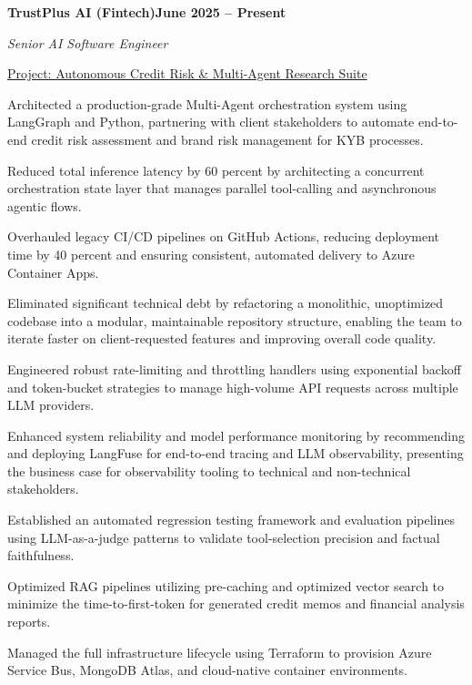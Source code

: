 \documentclass[letterpaper,10pt]{article}
\newcommand{\headingBf}[2]{\par\noindent\hspace*{10pt}\textbf{#1}\hfill\textbf{#2}}
\newcommand{\headingIt}[2]{\par\noindent\hspace*{10pt}\textit{#1}\hfill\textit{#2}}
\newenvironment{resume_list}{\vspace{-7pt}\begin{itemize}[itemsep=-2px, parsep=1pt, leftmargin=30pt]}{\end{itemize}}
\newcommand{\itemTitle}[1]{\item[] \underline{#1}\vspace{4pt}}
\begin{document}
  \headingBf{TrustPlus AI (Fintech)}{June 2025 -- Present}
  \headingIt{Senior AI Software Engineer}{}
  \begin{resume_list}
    \itemTitle{Project: Autonomous Credit Risk \& Multi-Agent Research Suite}
    \item Architected a production-grade Multi-Agent orchestration system using LangGraph and Python, partnering with client stakeholders to automate end-to-end credit risk assessment and brand risk management for KYB processes.
    \item Reduced total inference latency by 60 percent by architecting a concurrent orchestration state layer that manages parallel tool-calling and asynchronous agentic flows.
    \item Overhauled legacy CI/CD pipelines on GitHub Actions, reducing deployment time by 40 percent and ensuring consistent, automated delivery to Azure Container Apps.
    \item Eliminated significant technical debt by refactoring a monolithic, unoptimized codebase into a modular, maintainable repository structure, enabling the team to iterate faster on client-requested features and improving overall code quality.
    \item Engineered robust rate-limiting and throttling handlers using exponential backoff and token-bucket strategies to manage high-volume API requests across multiple LLM providers.
    \item Enhanced system reliability and model performance monitoring by recommending and deploying LangFuse for end-to-end tracing and LLM observability, presenting the business case for observability tooling to technical and non-technical stakeholders.
    \item Established an automated regression testing framework and evaluation pipelines using LLM-as-a-judge patterns to validate tool-selection precision and factual faithfulness.
    \item Optimized RAG pipelines utilizing pre-caching and optimized vector search to minimize the time-to-first-token for generated credit memos and financial analysis reports.
    \item Managed the full infrastructure lifecycle using Terraform to provision Azure Service Bus, MongoDB Atlas, and cloud-native container environments.
  \end{resume_list}
\end{document}
